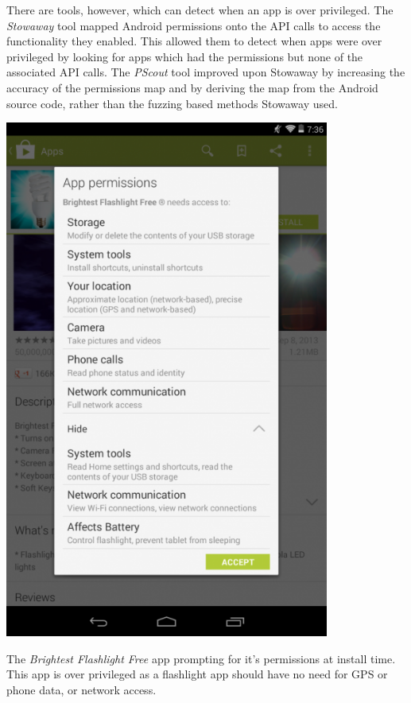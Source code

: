 \documentclass[a4paper]{article}
\begin{document}
There are tools, however, which can detect when an app is over privileged. The
\emph{Stowaway} tool\cite{Felt:2011kj} mapped Android permissions onto the API
calls to access the functionality they enabled. This allowed them to detect
when apps were over privileged by looking for apps which had the permissions but
none of the associated API calls. The \emph{PScout} tool\cite{Au:2012ju}
improved upon Stowaway by increasing the accuracy of the permissions map and by
deriving the map from the Android source code, rather than the fuzzing based
methods Stowaway used.

\begin{marginfigure}\label{img:brightestflashlight}
  \centering
  \includegraphics[width=0.8\textwidth]{img/brightestflashlight.png}
  \caption{The \emph{Brightest Flashlight Free} app prompting for it's permissions
    at install time. This app is over privileged as a flashlight app should have
    no need for GPS or phone data, or network access.}
\end{marginfigure}
\end{document}
